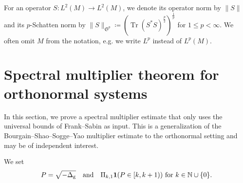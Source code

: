 \documentclass[12pt,reqno,a4paper]{amsart}
\let\coloneq\relax
\newcommand{\coloneq}{\coloneqq}
\newcommand{\N}{{\mathbb N}}
\DeclareMathOperator{\tr}{Tr}
\newcommand{\g}{{\rm g}}
\newcommand\nhi[1]{\textcolor{blue}{#1}}
\begin{document}
%
For an operator $S:L^2(M)\to L^2(M)$, we denote its operator norm by $\|S\|$ and its $p$-Schatten norm by $\|S\|_{\mathfrak{S}^p}\coloneqq (\tr(S^*S)^{\frac{p}{2}})^{\frac{1}{p}}$ for $1\leq p<\infty$. We often omit $M$ from the notation, e.g. we write $L^p$ instead of $L^p(M)$.


\section{Spectral multiplier theorem for orthonormal systems}\label{sec:multiplier}

In this section, we prove a spectral multiplier estimate that only uses the universal bounds of Frank--Sabin as input. This is a generalization of the Bourgain--Shao--Sogge--Yao multiplier estimate \cite[Lemma 2.3]{BourgainShaoYaoSogge-2015} to the orthonormal setting and may be of independent interest.

We set
\begin{align*}
P=\sqrt{-\Delta_\g}\quad \mbox{and}\quad
  \Pi_{k,1}\coloneq\mathbf{1}(P\in [k,k+1))\ \mbox{for }k\in \N\cup\{0\}.
\end{align*}
\end{document}
